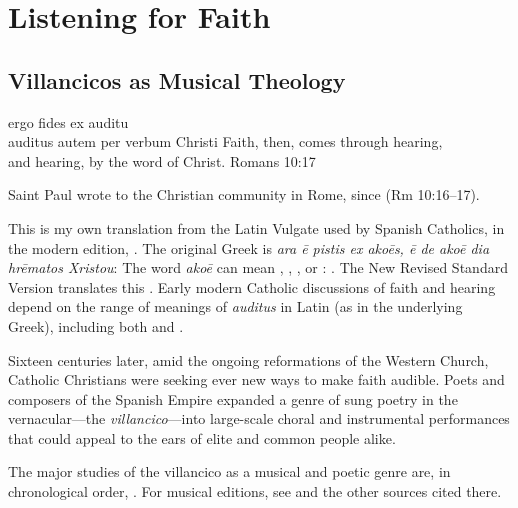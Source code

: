 % 

\part{Listening for Faith}
\label{part:faith}

\chapter{Villancicos as Musical Theology}
\label{ch:intro}

\epigraphTranslation
{ergo fides ex auditu\\
auditus autem per verbum Christi}
{Faith, then, comes through hearing, \\
and hearing, by the word of Christ.}
{Romans 10:17}


Saint Paul wrote to the Christian community in Rome,  since  (Rm 10:16--17).%
\begin{Footnote}
    This is my own translation from the Latin Vulgate used by Spanish Catholics, in
    the modern edition, \autocite{Weber:Vulgate}.
    The original Greek is \emph{ara ē pistis ex akoēs, ē de akoē dia hrēmatos
    Xristou}: \autocite{Aland:GNT4}
    The word \emph{akoē} can mean , , , or : \autocite{BDAG}.
    The New Revised Standard Version translates this .
    Early modern Catholic discussions of faith and hearing depend on the range of
    meanings of \emph{auditus} in Latin (as in the underlying Greek), including both
     and .
\end{Footnote}
Sixteen centuries later, amid the ongoing reformations of the Western Church,
Catholic Christians were seeking ever new ways to make faith audible. 
Poets and composers of the Spanish Empire expanded a genre of sung poetry in the
vernacular---the \emph{villancico}---into large-scale choral and instrumental
performances that could appeal to the ears of elite and common people alike.%
\begin{Footnote}
    The major studies of the villancico as a musical and poetic genre are, in
    chronological order,
    \autocites{Rubio:Forma}{Laird:VC}{Torrente:PhD}{Tenorio:SorJuana}
    {CaberoPueyo:PhD}{Illari:Polychoral}{Knighton-Torrente:VCs}
    {Davies:Guadalupe}
    {Cashner:Cards}{Cashner:PhD}
    {LopezLorenzo:VC-Sevillano}{Swadley:VillancicoPhD}{Torrente:Historia17C}
    {ChavezBarcenas:PhD}.
    For musical editions, see \autocite{Cashner:WLSCM32} and the other sources
    cited there.
\end{Footnote}

